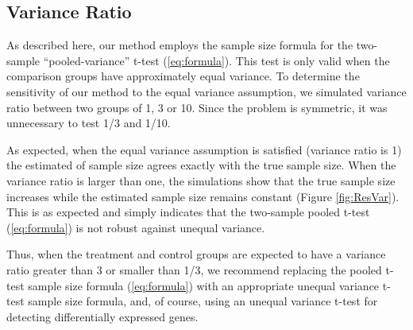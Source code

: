\documentclass{bioinfo}
\begin{document}
\subsection{Variance Ratio}

As described here, our method employs the sample size formula for
the two-sample ``pooled-variance'' t-test (\ref{eq:formula}).
This test is only valid when the comparison groups have
approximately equal variance. To determine the sensitivity of our
method to the equal variance assumption, we simulated variance
ratio between two groups of 1, 3 or 10.  Since the problem is
symmetric, it was unnecessary to test 1/3 and 1/10.

As expected, when the equal variance assumption is satisfied
(variance ratio is 1) the estimated of sample size agrees exactly
with the true sample size. When the variance ratio is larger than
one, the simulations show that the true sample size increases
while the estimated sample size remains constant (Figure
\ref{fig:ResVar}).   This is as expected and simply indicates that
the two-sample pooled t-test (\ref{eq:formula}) is not robust
against unequal variance.

Thus, when the treatment and control groups are expected to have a
variance ratio greater than 3 or smaller than 1/3, we recommend
replacing the pooled t-test sample size formula (\ref{eq:formula})
with an appropriate unequal variance t-test sample size formula,
and, of course, using an unequal variance t-test for detecting
differentially expressed genes.
\end{document}
